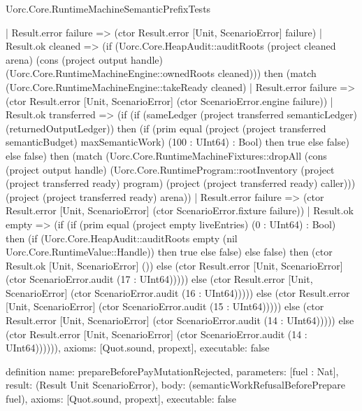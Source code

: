 \begin{lexlean}{Uorc.Core.RuntimeMachineSemanticPrefixTests}
\begin{semanticmodule}
{          | Result.error failure => (ctor Result.error [Unit, ScenarioError] failure)
          | Result.ok cleaned => (if (Uorc.Core.HeapAudit::auditRoots (project cleaned arena) (cons (project output handle) (Uorc.Core.RuntimeMachineEngine::ownedRoots cleaned))) then (match (Uorc.Core.RuntimeMachineEngine::takeReady cleaned)
            | Result.error failure => (ctor Result.error [Unit, ScenarioError] (ctor ScenarioError.engine failure))
            | Result.ok transferred => (if (if (sameLedger (project transferred semanticLedger) (returnedOutputLedger)) then (if (prim equal (project (project transferred semanticBudget) maxSemanticWork) (100 : UInt64) : Bool) then true else false) else false) then (match (Uorc.Core.RuntimeMachineFixtures::dropAll (cons (project output handle) (Uorc.Core.RuntimeProgram::rootInventory (project (project transferred ready) program) (project (project transferred ready) caller))) (project (project transferred ready) arena))
              | Result.error failure => (ctor Result.error [Unit, ScenarioError] (ctor ScenarioError.fixture failure))
              | Result.ok empty => (if (if (prim equal (project empty liveEntries) (0 : UInt64) : Bool) then (if (Uorc.Core.HeapAudit::auditRoots empty (nil Uorc.Core.RuntimeValue::Handle)) then true else false) else false) then (ctor Result.ok [Unit, ScenarioError] ()) else (ctor Result.error [Unit, ScenarioError] (ctor ScenarioError.audit (17 : UInt64))))) else (ctor Result.error [Unit, ScenarioError] (ctor ScenarioError.audit (16 : UInt64))))) else (ctor Result.error [Unit, ScenarioError] (ctor ScenarioError.audit (15 : UInt64))))) else (ctor Result.error [Unit, ScenarioError] (ctor ScenarioError.audit (14 : UInt64))))) else (ctor Result.error [Unit, ScenarioError] (ctor ScenarioError.audit (14 : UInt64)))))),
  axioms: [Quot.sound, propext],
  executable: false
}

definition{
  name: prepareBeforePayMutationRejected,
  parameters: [fuel : Nat],
  result: (Result Unit ScenarioError),
  body: (semanticWorkRefusalBeforePrepare fuel),
  axioms: [Quot.sound, propext],
  executable: false
}


\end{semanticmodule}
\end{lexlean}

